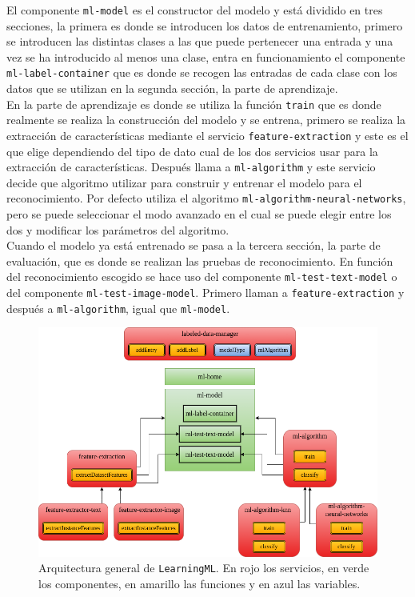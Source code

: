 \documentclass[a4paper, 12pt]{book}
\begin{document}
El componente \texttt{ml-model} es el constructor del modelo y está dividido en tres secciones, la primera es donde se introducen los datos de entrenamiento, primero se introducen las distintas clases a las que puede pertenecer una entrada y una vez se ha introducido al menos una clase, entra en funcionamiento el componente \texttt{ml-label-container} que es donde se recogen las entradas de cada clase con los datos que se utilizan en la segunda sección, la parte de aprendizaje. \\
En la parte de aprendizaje es donde se utiliza la función \texttt{train} que es donde realmente se realiza la construcción del modelo y se entrena, primero se realiza la extracción de características mediante el servicio \texttt{feature-extraction} y este es el que elige dependiendo del tipo de dato cual de los dos servicios usar para la extracción de características. 
Después llama a \texttt{ml-algorithm} y este servicio decide que algoritmo utilizar para construir y entrenar el modelo para el reconocimiento. 
Por defecto utiliza el algoritmo \texttt{ml-algorithm-neural-networks}, pero se puede seleccionar el modo avanzado en el cual se puede elegir entre los dos y modificar los parámetros del algoritmo.\\
Cuando el modelo ya está entrenado se pasa a la tercera sección, la parte de evaluación, que es donde se realizan las pruebas de reconocimiento. 
En función del reconocimiento escogido se hace uso del componente \texttt{ml-test-text-model} o del componente \texttt{ml-test-image-model}. 
Primero llaman a \texttt{feature-extraction} y después a \texttt{ml-algorithm}, igual que \texttt{ml-model}.

\begin{figure}
	\centering
	\includegraphics[width=13cm, keepaspectratio]{img/arquitectura.png}
	\caption{Arquitectura general de \texttt{LearningML}. En rojo los servicios, en verde los componentes, en amarillo las funciones y en azul las variables.} \label{fig:arquitectura}
\end{figure}
\end{document}
